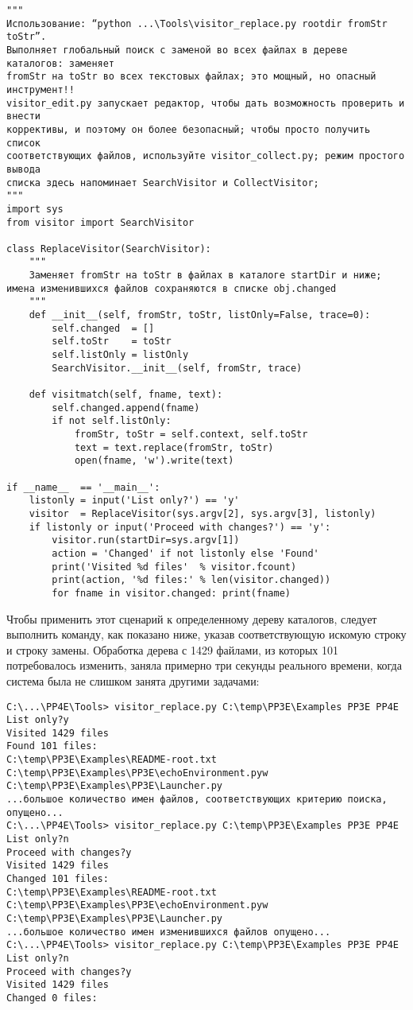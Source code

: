 \documentclass[12pt]{article}
\begin{document}
\begin{verbatim}
"""
Использование: “python ...\Tools\visitor_replace.py rootdir fromStr toStr”.
Выполняет глобальный поиск с заменой во всех файлах в дереве каталогов: заменяет
fromStr на toStr во всех текстовых файлах; это мощный, но опасный инструмент!!
visitor_edit.py запускает редактор, чтобы дать возможность проверить и внести
коррективы, и поэтому он более безопасный; чтобы просто получить список
соответствующих файлов, используйте visitor_collect.py; режим простого вывода
списка здесь напоминает SearchVisitor и CollectVisitor;
"""
import sys
from visitor import SearchVisitor

class ReplaceVisitor(SearchVisitor):
    """
    Заменяет fromStr на toStr в файлах в каталоге startDir и ниже;
имена изменившихся файлов сохраняются в списке obj.changed
    """
    def __init__(self, fromStr, toStr, listOnly=False, trace=0):
        self.changed  = []
        self.toStr    = toStr
        self.listOnly = listOnly
        SearchVisitor.__init__(self, fromStr, trace)

    def visitmatch(self, fname, text):
        self.changed.append(fname)
        if not self.listOnly:
            fromStr, toStr = self.context, self.toStr
            text = text.replace(fromStr, toStr)
            open(fname, 'w').write(text)

if __name__  == '__main__':
    listonly = input('List only?') == 'y'
    visitor  = ReplaceVisitor(sys.argv[2], sys.argv[3], listonly)
    if listonly or input('Proceed with changes?') == 'y':
        visitor.run(startDir=sys.argv[1])
        action = 'Changed' if not listonly else 'Found'
        print('Visited %d files'  % visitor.fcount)
        print(action, '%d files:' % len(visitor.changed))
        for fname in visitor.changed: print(fname)
\end{verbatim}
Чтобы применить этот сценарий к определенному дереву каталогов, следует выполнить команду, как показано ниже, указав соответствующую искомую строку и строку замены. Обработка дерева с 1429 файлами, из которых 101 потребовалось изменить, заняла примерно три секунды реального времени, когда сис­тема
была не слишком занята другими задачами:
\begin{verbatim}
C:\...\PP4E\Tools> visitor_replace.py C:\temp\PP3E\Examples PP3E PP4E
List only?y
Visited 1429 files
Found 101 files:
C:\temp\PP3E\Examples\README-root.txt
C:\temp\PP3E\Examples\PP3E\echoEnvironment.pyw
C:\temp\PP3E\Examples\PP3E\Launcher.py
...большое количество имен файлов, соответствующих критерию поиска,
опущено...
C:\...\PP4E\Tools> visitor_replace.py C:\temp\PP3E\Examples PP3E PP4E
List only?n
Proceed with changes?y
Visited 1429 files
Changed 101 files:
C:\temp\PP3E\Examples\README-root.txt
C:\temp\PP3E\Examples\PP3E\echoEnvironment.pyw
C:\temp\PP3E\Examples\PP3E\Launcher.py
...большое количество имен изменившихся файлов опущено...
C:\...\PP4E\Tools> visitor_replace.py C:\temp\PP3E\Examples PP3E PP4E
List only?n
Proceed with changes?y
Visited 1429 files
Changed 0 files:
\end{verbatim}
\end{document}
